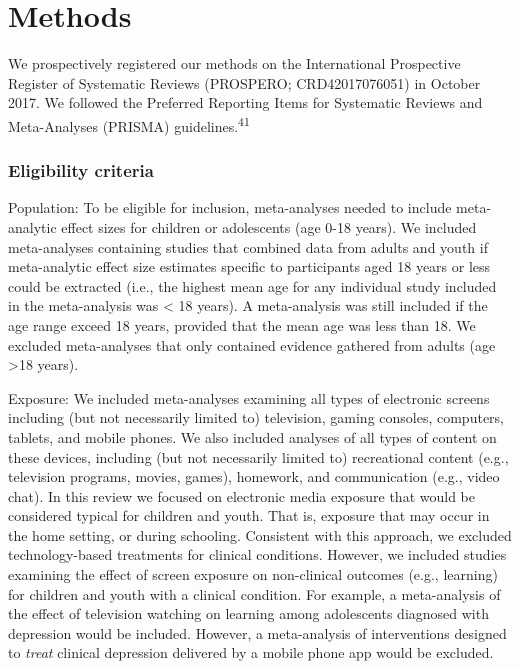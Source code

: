 \documentclass[
  english,
  man]{apa6}
\begin{document}
\hypertarget{methods}{%
\section{Methods}\label{methods}}

We prospectively registered our methods on the International Prospective Register of Systematic Reviews (PROSPERO; CRD42017076051) in October 2017.
We followed the Preferred Reporting Items for Systematic Reviews and Meta-Analyses (PRISMA) guidelines.\textsuperscript{41}

\hypertarget{eligibility-criteria}{%
\subsubsection{Eligibility criteria}\label{eligibility-criteria}}

Population:
To be eligible for inclusion, meta-analyses needed to include meta-analytic effect sizes for children or adolescents (age 0-18 years).
We included meta-analyses containing studies that combined data from adults and youth if meta-analytic effect size estimates specific to participants aged 18 years or less could be extracted (i.e., the highest mean age for any individual study included in the meta-analysis was \textless{} 18 years).
A meta-analysis was still included if the age range exceed 18 years, provided that the mean age was less than 18.
We excluded meta-analyses that only contained evidence gathered from adults (age \textgreater18 years).

Exposure:
We included meta-analyses examining all types of electronic screens including (but not necessarily limited to) television, gaming consoles, computers, tablets, and mobile phones.
We also included analyses of all types of content on these devices, including (but not necessarily limited to) recreational content (e.g., television programs, movies, games), homework, and communication (e.g., video chat).
In this review we focused on electronic media exposure that would be considered typical for children and youth.
That is, exposure that may occur in the home setting, or during schooling.
Consistent with this approach, we excluded technology-based treatments for clinical conditions.
However, we included studies examining the effect of screen exposure on non-clinical outcomes (e.g., learning) for children and youth with a clinical condition.
For example, a meta-analysis of the effect of television watching on learning among adolescents diagnosed with depression would be included.
However, a meta-analysis of interventions designed to \emph{treat} clinical depression delivered by a mobile phone app would be excluded.
\end{document}
